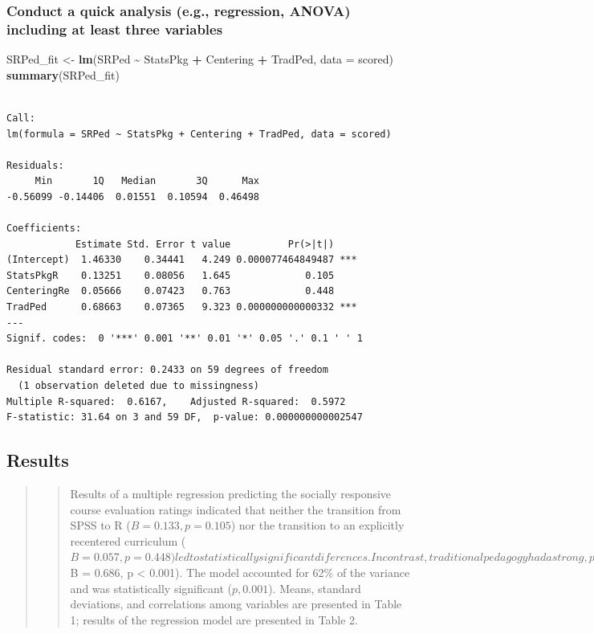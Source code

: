 \documentclass[
  11pt,
]{book}
\newenvironment{Shaded}{\begin{snugshade}}{\end{snugshade}}
\newcommand{\AttributeTok}[1]{\textcolor[rgb]{0.27,0.27,0.27}{#1}}
\newcommand{\FunctionTok}[1]{\textcolor[rgb]{0.27,0.27,0.27}{\textbf{#1}}}
\newcommand{\NormalTok}[1]{#1}
\newcommand{\OtherTok}[1]{\textcolor[rgb]{0.37,0.37,0.37}{#1}}
\newcommand{\SpecialCharTok}[1]{\textcolor[rgb]{0.43,0.43,0.43}{\textbf{#1}}}
\begin{document}
\hypertarget{conduct-a-quick-analysis-e.g.-regression-anova-including-at-least-three-variables}{%
\subsubsection*{Conduct a quick analysis (e.g., regression, ANOVA) including at least three variables}\label{conduct-a-quick-analysis-e.g.-regression-anova-including-at-least-three-variables}}


\begin{Shaded}
\begin{Highlighting}[]
\NormalTok{SRPed\_fit }\OtherTok{\textless{}{-}} \FunctionTok{lm}\NormalTok{(SRPed }\SpecialCharTok{\textasciitilde{}}\NormalTok{ StatsPkg }\SpecialCharTok{+}\NormalTok{ Centering }\SpecialCharTok{+}\NormalTok{ TradPed, }\AttributeTok{data =}\NormalTok{ scored)}
\FunctionTok{summary}\NormalTok{(SRPed\_fit)}
\end{Highlighting}
\end{Shaded}

\begin{verbatim}

Call:
lm(formula = SRPed ~ StatsPkg + Centering + TradPed, data = scored)

Residuals:
     Min       1Q   Median       3Q      Max 
-0.56099 -0.14406  0.01551  0.10594  0.46498 

Coefficients:
            Estimate Std. Error t value          Pr(>|t|)    
(Intercept)  1.46330    0.34441   4.249 0.000077464849487 ***
StatsPkgR    0.13251    0.08056   1.645             0.105    
CenteringRe  0.05666    0.07423   0.763             0.448    
TradPed      0.68663    0.07365   9.323 0.000000000000332 ***
---
Signif. codes:  0 '***' 0.001 '**' 0.01 '*' 0.05 '.' 0.1 ' ' 1

Residual standard error: 0.2433 on 59 degrees of freedom
  (1 observation deleted due to missingness)
Multiple R-squared:  0.6167,    Adjusted R-squared:  0.5972 
F-statistic: 31.64 on 3 and 59 DF,  p-value: 0.000000000002547
\end{verbatim}

\hypertarget{results-2}{%
\subsection{Results}\label{results-2}}

\begin{quote}
\begin{quote}
Results of a multiple regression predicting the socially responsive course evaluation ratings indicated that neither the transition from SPSS to R (\(B = 0.133, p = 0.105\)) nor the transition to an explicitly recentered curriculum (\(B = 0.057, p = 0.448) led to statistically significant diferences. In contrast, traditional pedagogy had a strong, positive effect on evaluations of socially responsive pedagogy (\)B = 0.686, p \textless{} 0.001). The model accounted for 62\% of the variance and was statistically significant (\(p , 0.001\)). Means, standard deviations, and correlations among variables are presented in Table 1; results of the regression model are presented in Table 2.
\end{quote}
\end{quote}
\end{document}
